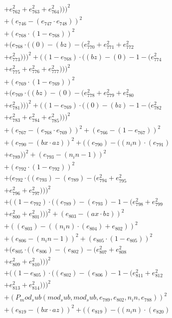 \documentclass[10pt, a4paper]{article}
\begin{document}
\begin{align*}
& + e_{762}^{2} + e_{763}^{2} + e_{764}^{2})))^{2} \\
& + (e_{746} - (e_{747}  \cdot  e_{748}))^{2} \\
& + (e_{768}  \cdot  (1 - e_{768}))^{2} \\
& + (e_{768}  \cdot  ((0) - (bz) - (e_{770}^{2} + e_{771}^{2} + e_{772}^{2} \\
& + e_{773}^{2})))^{2} + ((1 - e_{768})  \cdot  ((bz) - (0) - 1 - (e_{774}^{2} \\
& + e_{775}^{2} + e_{776}^{2} + e_{777}^{2})))^{2} \\
& + (e_{769}  \cdot  (1 - e_{769}))^{2} \\
& + (e_{769}  \cdot  ((bz) - (0) - (e_{778}^{2} + e_{779}^{2} + e_{780}^{2} \\
& + e_{781}^{2})))^{2} + ((1 - e_{769})  \cdot  ((0) - (bz) - 1 - (e_{782}^{2} \\
& + e_{783}^{2} + e_{784}^{2} + e_{785}^{2})))^{2} \\
& + (e_{767} - (e_{768}  \cdot  e_{769}))^{2} + (e_{766} - (1 - e_{767}))^{2} \\
& + (e_{790} - (bx  \cdot  az))^{2} + ((e_{790}) - ((n_in)  \cdot  (e_{791}) \\
& + e_{789}))^{2} + (e_{793} - (n_in - 1))^{2} \\
& + (e_{792}  \cdot  (1 - e_{792}))^{2} \\
& + (e_{792}  \cdot  ((e_{793}) - (e_{789}) - (e_{794}^{2} + e_{795}^{2} \\
& + e_{796}^{2} + e_{797}^{2})))^{2} \\
& + ((1 - e_{792})  \cdot  ((e_{789}) - (e_{793}) - 1 - (e_{798}^{2} + e_{799}^{2} \\
& + e_{800}^{2} + e_{801}^{2})))^{2} + (e_{803} - (ax  \cdot  bz))^{2} \\
& + ((e_{803}) - ((n_in)  \cdot  (e_{804}) + e_{802}))^{2} \\
& + (e_{806} - (n_in - 1))^{2} + (e_{805}  \cdot  (1 - e_{805}))^{2} \\
& + (e_{805}  \cdot  ((e_{806}) - (e_{802}) - (e_{807}^{2} + e_{808}^{2} \\
& + e_{809}^{2} + e_{810}^{2})))^{2} \\
& + ((1 - e_{805})  \cdot  ((e_{802}) - (e_{806}) - 1 - (e_{811}^{2} + e_{812}^{2} \\
& + e_{813}^{2} + e_{814}^{2})))^{2} \\
& + (P_mod_sub(mod_sub, mod_sub, e_{789}, e_{802}, n_in, e_{788}))^{2} \\
& + (e_{819} - (bx  \cdot  az))^{2} + ((e_{819}) - ((n_in)  \cdot  (e_{820}) \\

\end{align*}
\end{document}
